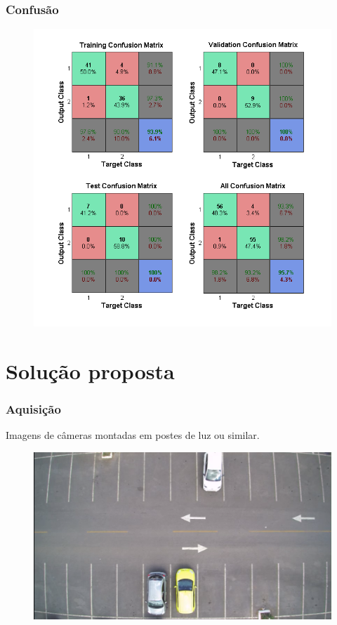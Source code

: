 \documentclass{beamer}
\begin{document}
\begin{frame}
\frametitle{Confusão}
\begin{figure}
\centering
\includegraphics[width=.6\textwidth]{ConfusaoRede}
\centering
\end{figure}

\end{frame}

\section{Solução proposta}

\begin{frame}
\frametitle{Aquisição}
    \begin{block}{}
    Imagens de câmeras montadas em postes de luz ou similar.
    \end{block}
\begin{figure}
	\centering
	\includegraphics[width=.4\textwidth]{Vazio3}
	\centering
\end{figure}
\end{frame}

\end{document}
